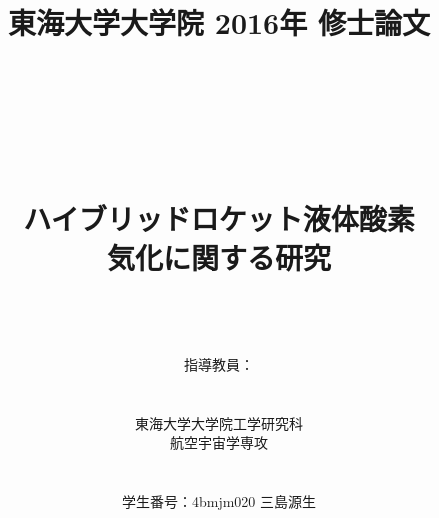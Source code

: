 \documentclass[12pt,oneside, a4j]{jbook}
\begin{document}
\frontmatter
\title{東海大学大学院 2016年 修士論文 \\\\\\ \\ \\ ハイブリッドロケット液体酸素\\気化に関する研究}
\author{\\ \\ \\指導教員：\\\\\\東海大学大学院工学研究科\\航空宇宙学専攻\\\\\\学生番号：4bmjm020 三島源生}
\maketitle



\tableofcontents
\listoftables
\listoffigures

\clearpage

\mainmatter

\clearpage

\clearpage
\end{document}
